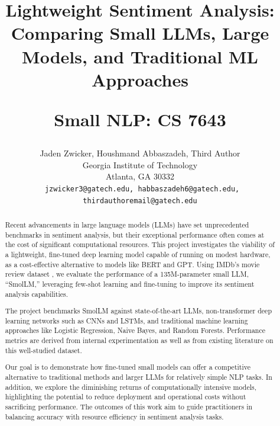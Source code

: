 \documentclass[10pt,twocolumn,letterpaper]{article}
\begin{document}
\title{
Lightweight Sentiment Analysis: Comparing Small LLMs, Large Models, and Traditional ML Approaches

Small NLP: CS 7643
}

\author{
Jaden Zwicker, 
Houshmand Abbaszadeh,
Third Author 
\\
Georgia Institute of Technology\\
Atlanta, GA 30332\\
{\tt\small 
jzwicker3@gatech.edu, 
habbaszadeh6@gatech.edu, 
thirdauthoremail@gatech.edu}
}



\maketitle

\begin{abstract}
Recent advancements in large language models (LLMs) have set unprecedented benchmarks in sentiment analysis, but their exceptional performance often comes at the cost of significant computational resources. This project investigates the viability of a lightweight, fine-tuned deep learning model capable of running on modest hardware, as a cost-effective alternative to models like BERT and GPT. Using IMDb’s movie review dataset \cite{IMDB-dataset}, we evaluate the performance of a 135M-parameter small LLM, “SmolLM,” leveraging few-shot learning and fine-tuning to improve its sentiment analysis capabilities.

The project benchmarks SmolLM against state-of-the-art LLMs, non-transformer deep learning networks such as CNNs and LSTMs, and traditional machine learning approaches like Logistic Regression, Naive Bayes, and Random Forests. Performance metrics are derived from internal experimentation as well as from existing literature on this well-studied dataset.

Our goal is to demonstrate how fine-tuned small models can offer a competitive alternative to traditional methods and larger LLMs for relatively simple NLP tasks. In addition, we explore the diminishing returns of computationally intensive models, highlighting the potential to reduce deployment and operational costs without sacrificing performance. The outcomes of this work aim to guide practitioners in balancing accuracy with resource efficiency in sentiment analysis tasks.

\end{abstract}
\end{document}
